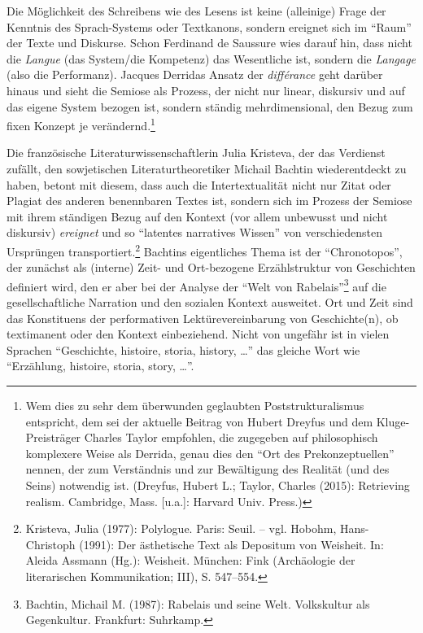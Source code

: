 Die Möglichkeit des Schreibens wie des Lesens ist keine (alleinige)
Frage der Kenntnis des Sprach-Systems oder Textkanons, sondern ereignet
sich im \enquote{Raum} der Texte und Diskurse. Schon Ferdinand de
Saussure wies darauf hin, dass nicht die \emph{Langue} (das System/die
Kompetenz) das Wesentliche ist, sondern die \emph{Langage} (also die
Performanz). Jacques Derridas Ansatz der \emph{différance} geht darüber
hinaus und sieht die Semiose als Prozess, der nicht nur linear,
diskursiv und auf das eigene System bezogen ist, sondern ständig
mehrdimensional, den Bezug zum fixen Konzept je verändernd.\footnote{Wem
  dies zu sehr dem überwunden geglaubten Poststrukturalismus entspricht,
  dem sei der aktuelle Beitrag von Hubert Dreyfus und dem
  Kluge-Preisträger Charles Taylor empfohlen, die zugegeben auf
  philosophisch komplexere Weise als Derrida, genau dies den
  \enquote{Ort des Prekonzeptuellen} nennen, der zum Verständnis und zur
  Bewältigung des Realität (und des Seins) notwendig ist. (Dreyfus,
  Hubert L.; Taylor, Charles (2015): Retrieving realism. Cambridge,
  Mass. {[}u.a.{]}: Harvard Univ. Press.)}

Die französische Literaturwissenschaftlerin Julia Kristeva, der das
Verdienst zufällt, den sowjetischen Literaturtheoretiker Michail Bachtin
wiederentdeckt zu haben, betont mit diesem, dass auch die
Intertextualität nicht nur Zitat oder Plagiat des anderen benennbaren
Textes ist, sondern sich im Prozess der Semiose mit ihrem ständigen
Bezug auf den Kontext (vor allem unbewusst und nicht diskursiv)
\emph{ereignet} und so \enquote{latentes narratives Wissen} von
verschiedensten Ursprüngen transportiert.\footnote{Kristeva, Julia
  (1977): Polylogue. Paris: Seuil. -- vgl. Hobohm, Hans-Christoph
  (1991): Der ästhetische Text als Depositum von Weisheit. In: Aleida
  Assmann (Hg.): Weisheit. München: Fink (Archäologie der literarischen
  Kommunikation; III), S. 547--554.} Bachtins eigentliches Thema ist der
\enquote{Chronotopos}, der zunächst als (interne) Zeit- und Ort-bezogene
Erzählstruktur von Geschichten definiert wird, den er aber bei der
Analyse der \enquote{Welt von Rabelais}\footnote{Bachtin, Michail M.
  (1987): Rabelais und seine Welt. Volkskultur als Gegenkultur.
  Frankfurt: Suhrkamp.} auf die gesellschaftliche Narration und den
sozialen Kontext ausweitet. Ort und Zeit sind das Konstituens der
performativen Lektürevereinbarung von Geschichte(n), ob textimanent oder
den Kontext einbeziehend. Nicht von ungefähr ist in vielen Sprachen
\enquote{Geschichte, histoire, storia, history, \ldots{}} das gleiche
Wort wie \enquote{Erzählung, histoire, storia, story, \ldots{}}.

